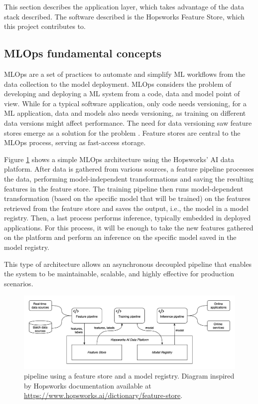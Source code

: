This section describes the application layer, which takes advantage of the data stack described. The software described is the Hopsworks Feature Store, which this project contributes to.

\subsection{MLOps fundamental concepts}

\gls{MLOps} are a set of practices to automate and simplify \gls{ML} workflows from the data collection to the model deployment. \gls{MLOps} considers the problem of developing and deploying a \gls{ML} system from a code, data and model point of view. While for a typical software application, only code needs versioning, for a \gls{ML} application, data and models also needs versioning, as training on different data versions might affect performance. The need for data versioning saw feature stores emerge as a solution for the problem \cite{MeetMichelangeloUbers2017}. Feature stores are central to the \gls{MLOps} process, serving as fast-access storage.

Figure \ref{fig:mlops} shows a simple \gls{MLOps} architecture using the Hopsworks' AI data platform. After data is gathered from various sources, a feature pipeline processes the data, performing model-independent transformations and saving the resulting features in the feature store. The training pipeline then runs model-dependent transformation (based on the specific model that will be trained) on the features retrieved from the feature store and saves the output, i.e., the model in a model registry. Then, a last process performs inference, typically embedded in deployed applications. For this process, it will be enough to take the new features gathered on the platform and perform an inference on the specific model saved in the model registry.

This type of architecture allows an asynchronous decoupled pipeline that enables the system to be maintainable, scalable, and highly effective for production scenarios.

\begin{figure}[!ht]
    \begin{center}
      \includegraphics[width=\textwidth]{figures/2-background/MLOps.png}
    \end{center}
    \caption[Feature store in an MLOps pipeline]{ pipeline using a feature store and a model registry. Diagram inspired by Hopsworks documentation available at \url{https://www.hopsworks.ai/dictionary/feature-store}.}
    \label{fig:mlops}
\end{figure}


